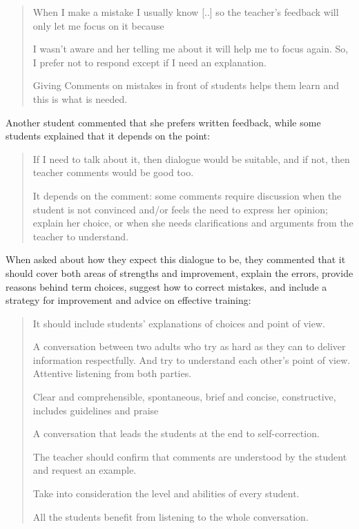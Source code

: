\documentclass[english]{textolivre}
\begin{document}
\begin{quote}
    When I make a mistake I usually know [..] so the teacher’s feedback will only let me focus on it because
    
I wasn't aware and her telling me about it will help me to focus again. So, I prefer not to respond except if I need an explanation.

Giving Comments on mistakes in front of students helps them learn and this is what is needed.
\end{quote}

Another student commented that she prefers written feedback, while some students explained that it depends on the point:

\begin{quote}
    If I need to talk about it, then dialogue would be suitable, and if not, then teacher comments would be good too.
    
It depends on the comment: some comments require discussion when the student is not convinced and/or feels the need to express her opinion; explain her choice, or when she needs clarifications and arguments from the teacher to understand.
\end{quote}

When asked about how they expect this dialogue to be, they commented that it should cover both areas of strengths and improvement, explain the errors, provide reasons behind term choices, suggest how to correct mistakes, and include a strategy for improvement and advice on effective training:

\begin{quote}
    It should include students’ explanations of choices and point of view.
    
A conversation between two adults who try as hard as they can to deliver information respectfully. And try to understand each other’s point of view. Attentive listening from both parties.

Clear and comprehensible, spontaneous, brief and concise, constructive, includes guidelines and praise

A conversation that leads the students at the end to self-correction.

The teacher should confirm that comments are understood by the student and request an example.

Take into consideration the level and abilities of every student.

All the students benefit from listening to the whole conversation.
\end{quote}
\end{document}
